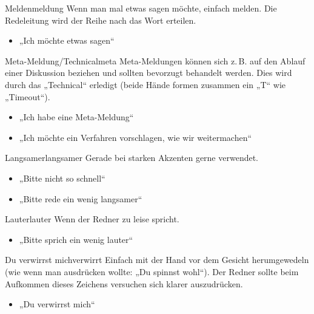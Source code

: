 \begin{handzeichen}[.2\linewidth]{Melden}{meldung}
Wenn man mal etwas sagen möchte, einfach melden. Die Redeleitung wird der Reihe
nach das Wort erteilen.
\begin{itemize}
	\item „Ich möchte etwas sagen“
\end{itemize}
\end{handzeichen}

\begin{handzeichen}{Meta-Meldung/Technical}{meta}
Meta-Meldungen können sich z.\,B. auf den Ablauf einer Diskussion beziehen und
sollten bevorzugt behandelt werden. Dies wird durch das „Technical“ erledigt
(beide Hände formen zusammen ein „T“ wie „Timeout“).
\begin{itemize}
	\item „Ich habe eine Meta-Meldung“
	\item „Ich möchte ein Verfahren vorschlagen, wie wir weitermachen“
\end{itemize}
\end{handzeichen}

\begin{handzeichen}{Langsamer}{langsamer}
Gerade bei starken Akzenten gerne verwendet.
\begin{itemize}
	\item „Bitte nicht so schnell“
	\item „Bitte rede ein wenig langsamer“
\end{itemize}
\end{handzeichen}

\begin{handzeichen}{Lauter}{lauter}
Wenn der Redner zu leise spricht.
\begin{itemize}
	\item „Bitte sprich ein wenig lauter“
\end{itemize}
\end{handzeichen}

\begin{handzeichen}{Du verwirrst mich}{verwirrt}
Einfach mit der Hand vor dem Gesicht herumgewedeln (wie wenn man ausdrücken
wollte: „Du spinnst wohl“). Der Redner sollte beim Aufkommen dieses Zeichens
versuchen sich klarer auszudrücken.
\begin{itemize}
	\item „Du verwirrst mich“
\end{itemize}
\end{handzeichen}

